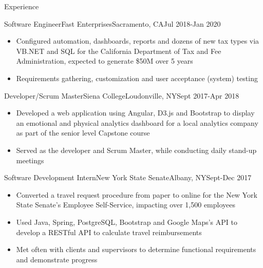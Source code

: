 \documentclass[]{xjavathehutt}
\begin{document}
\makeheader


\begin{cvsection}{Experience}
  \begin{cvsubsection}{Software Engineer}{Fast Enterprises}{Sacramento, CA}{Jul 2018-Jan 2020}
    \begin{itemize}
      \item{Configured automation, dashboards, reports and dozens of new tax types via VB.NET and SQL for the California Department of Tax and Fee Administration, expected
      to generate \$50M over 5 years}
      \item{Requirements gathering, customization and user acceptance (system) testing}
    \end{itemize}
  \end{cvsubsection}

  \begin{cvsubsection}{Developer/Scrum Master}{Siena College}{Loudonville, NY}{Sept 2017-Apr 2018}
    \begin{itemize}
      \item{Developed a web application using Angular, D3.js and Bootstrap to display an emotional and physical
          analytics dashboard for a local analytics company as part of the senior level Capstone course}
      \item{Served as the developer and Scrum Master, while conducting daily stand-up meetings}
    \end{itemize}
  \end{cvsubsection}

  \begin{cvsubsection}{Software Development Intern}{New York State Senate}{Albany, NY}{Sept-Dec 2017}
    \begin{itemize}
      \item{Converted a travel request procedure from paper to online for the New York
        State Senate's Employee Self-Service, impacting over 1,500 employees}
      \item{Used Java, Spring, PostgreSQL, Bootstrap and Google Maps's API to develop a RESTful API to calculate travel reimbursements}
      \item{Met often with clients and supervisors to determine functional requirements and demonstrate progress}
    \end{itemize}
  \end{cvsubsection}


\end{cvsection}
\end{document}
